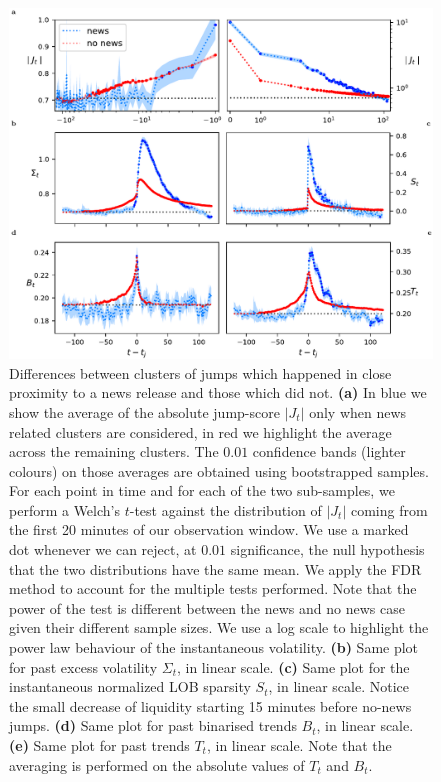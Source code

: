 \documentclass[amsmath,amssymb,aps,pre,floatfix,twocolumn,superscriptaddress]{revtex4}
\begin{document}
\begin{figure}
  \centering
  \includegraphics[width=0.9\linewidth]{fig2.pdf}
  \caption{Differences between clusters of jumps which happened in close proximity to a news release and those which did not. \textbf{(a)} In blue we show the average of the absolute jump-score $\vert J_t \vert$ only when news related clusters are considered, in red we highlight the average across the remaining clusters. The $0.01$ confidence bands (lighter colours) on those averages are obtained using bootstrapped samples. For each point in time and for each of the two sub-samples, we perform a Welch's $t$-test against the distribution of $\vert J_t \vert$ coming from the first 20 minutes of our observation window. We use a marked dot whenever we can reject, at $0.01$ significance, the null hypothesis that the two distributions have the same mean. We apply the FDR method to account for the multiple tests performed. Note that the power of the test is different between the news and no news case given their different sample sizes. We use a log scale to highlight the power law behaviour of the instantaneous volatility. \textbf{(b)} Same plot for past excess volatility $\Sigma_t$, in linear scale. \textbf{(c)} Same plot for the instantaneous normalized LOB sparsity $S_t$, in linear scale. Notice the small decrease of liquidity starting 15 minutes before no-news jumps. \textbf{(d)} Same plot for past binarised trends $B_t$, in linear scale. \textbf{(e)} Same plot for past trends $T_t$, in linear scale. Note that the averaging is performed on the absolute values of $T_t$ and $B_t$. }
  \label{fig: aggregated}
\end{figure}
\end{document}
